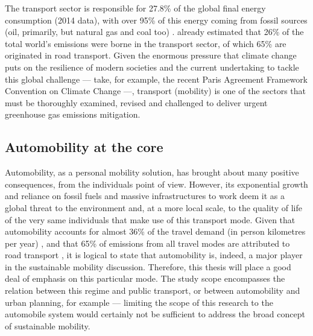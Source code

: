 The transport sector is responsible for 27.8\% of the global final energy consumption (2014 data), with over 95\% of this energy coming from fossil sources (oil, primarily, but natural gas and coal too) \parencite{iea2017_Statisticswebportal}. \textcite{chapman2007_Transportclimatechange} already estimated that 26\% of the total world's  emissions were borne in the transport sector, of which 65\% are originated in road transport. Given the enormous pressure that climate change puts on the resilience of modern societies \parencite{ipcc2014_ClimateChange2014} and the current undertaking to tackle this global challenge --- take, for example, the recent Paris Agreement Framework Convention on Climate Change \parencite{clemencon2016_TwoSidesParis} ---, transport (mobility) is one of the sectors that must be thoroughly examined, revised and challenged to deliver urgent greenhouse gas emissions mitigation.

\subsection{Automobility at the core}
\label{ss:intro:automobility-at-core}
Automobility, as a personal mobility solution, has brought about many positive consequences, from the individuals point of view. However, its exponential growth and reliance on fossil fuels and massive infrastructures to work deem it as a global threat to the environment and, at a more local scale, to the quality of life of the very same individuals that make use of this transport mode. Given that automobility accounts for almost 36\% of the travel demand (in person kilometres per year) \parencite{vuuren2017_Energylanduse}, and that 65\% of  emissions from all travel modes are attributed to road transport \parencite{chapman2007_Transportclimatechange}, it is logical to state that automobility is, indeed, a major player in the sustainable mobility discussion. Therefore, this thesis will place a good deal of emphasis on this particular mode. The study scope encompasses the relation between this regime and public transport, or between automobility and urban planning, for example --- limiting the scope of this research to the automobile system would certainly not be sufficient to address the broad concept of sustainable mobility.

%
%
